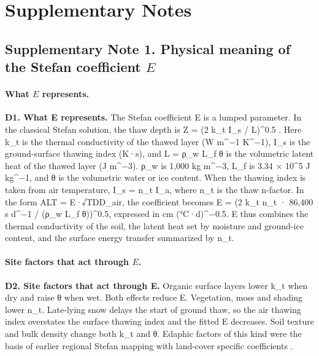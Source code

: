 \section*{Supplementary Notes}

\subsection*{Supplementary Note 1. Physical meaning of the Stefan coefficient $E$}

\paragraph*{What $E$ represents.} \textbf{D1. What E represents.} The Stefan coefficient E is a lumped parameter. In the classical Stefan solution, the thaw depth is Z = (2 k\_t I\_s / L)\textasciicircum{}0.5 \cite{Riseborough2008}. Here k\_t is the thermal conductivity of the thawed layer (W m\textasciicircum{}−1 K\textasciicircum{}−1), I\_s is the ground-surface thawing index (K·s), and L = ρ\_w L\_f θ is the volumetric latent heat of the thawed layer (J m\textasciicircum{}−3). ρ\_w is 1,000 kg m\textasciicircum{}−3, L\_f is 3.34 × 10\textasciicircum{}5 J kg\textasciicircum{}−1, and θ is the volumetric water or ice content. When the thawing index is taken from air temperature, I\_s = n\_t I\_a, where n\_t is the thaw n-factor\cite{Klene2001}. In the form ALT = E·√TDD\_air, the coefficient becomes E = (2 k\_t n\_t · 86,400 s d\textasciicircum{}−1 / (ρ\_w L\_f θ))\textasciicircum{}0.5, expressed in cm (°C·d)\textasciicircum{}−0.5. E thus combines the thermal conductivity of the soil, the latent heat set by moisture and ground-ice content, and the surface energy transfer summarized by n\_t.

\paragraph*{Site factors that act through $E$.} \textbf{D2. Site factors that act through E.} Organic surface layers lower k\_t when dry and raise θ when wet. Both effects reduce E. Vegetation, moss and shading lower n\_t. Late-lying snow delays the start of ground thaw, so the air thawing index overstates the surface thawing index and the fitted E decreases. Soil texture and bulk density change both k\_t and θ. Edaphic factors of this kind were the basis of earlier regional Stefan mapping with land-cover specific coefficients \cite{Nelson1997,ShiklomanovNelson2002}.


